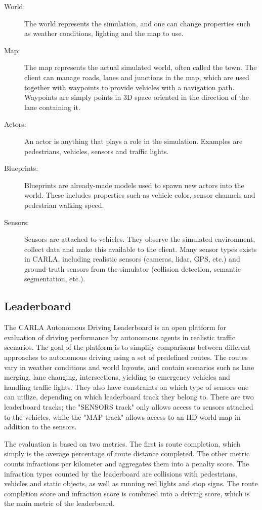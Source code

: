\begin{description}
    \item[World:] The world represents the simulation, and one can change properties such as weather conditions, lighting and the map to use.
    \item[Map:] The map represents the actual simulated world, often called the town. The client can manage roads, lanes and junctions in the map, which are used together with waypoints to provide vehicles with a navigation path. Waypoints are simply points in 3D space oriented in the direction of the lane containing it.
    \item[Actors:] An actor is anything that plays a role in the simulation. Examples are pedestrians, vehicles, sensors and traffic lights.
    \item[Blueprints:] Blueprints are already-made models used to spawn new actors into the world. These includes properties such as vehicle color, sensor channels and pedestrian walking speed.
    \item[Sensors:] Sensors are attached to vehicles. They observe the simulated environment, collect data and make this available to the client. Many sensor types exists in CARLA, including realistic sensors (cameras, \acrshort{lidar}, GPS, etc.) and ground-truth sensors from the simulator (collision detection, semantic segmentation, etc.). 
\end{description}


\subsection{Leaderboard}
The CARLA Autonomous Driving Leaderboard \cite{carla-leaderboard} is an open platform for evaluation of driving performance by autonomous agents in realistic traffic scenarios. The goal of the platform is to simplify comparisons between different approaches to autonomous driving using a set of predefined routes. The routes vary in weather conditions and world layouts, and contain scenarios such as lane merging, lane changing, intersections, yielding to emergency vehicles and handling traffic lights. They also have constraints on which type of sensors one can utilize, depending on which leaderboard track they belong to. There are two leaderboard tracks; the "SENSORS track" only allows access to sensors attached to the vehicles, while the "MAP track" allows access to an HD world map in addition to the sensors.

The evaluation is based on two metrics. The first is route completion, which simply is the average percentage of route distance completed. The other metric counts infractions per kilometer and aggregates them into a penalty score. The infraction types counted by the leaderboard are collisions with pedestrians, vehicles and static objects, as well as running red lights and stop signs. The route completion score and infraction score is combined into a driving score, which is the main metric of the leaderboard.

